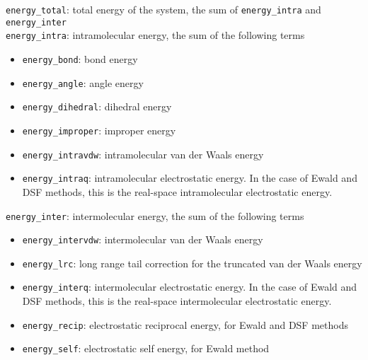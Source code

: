 \texttt{energy\_total}: total energy of the system, the sum of \texttt{energy\_intra} and \texttt{energy\_inter} \\
\texttt{energy\_intra}: intramolecular energy, the sum of the following terms
\begin{itemize}
\item \texttt{energy\_bond}: bond energy
\item \texttt{energy\_angle}: angle energy
\item \texttt{energy\_dihedral}: dihedral energy
\item \texttt{energy\_improper}: improper energy
\item \texttt{energy\_intravdw}: intramolecular van der Waals energy
\item \texttt{energy\_intraq}: intramolecular electrostatic energy.
In the case of Ewald and DSF methods, this is the real-space intramolecular electrostatic energy.
\end{itemize}
\texttt{energy\_inter}: intermolecular energy, the sum of the following terms
\begin{itemize}
\item \texttt{energy\_intervdw}: intermolecular van der Waals energy
\item \texttt{energy\_lrc}: long range tail correction for the truncated van der Waals energy
\item \texttt{energy\_interq}: intermolecular electrostatic energy.
In the case of Ewald and DSF methods, this is the real-space intermolecular electrostatic energy.
\item \texttt{energy\_recip}: electrostatic reciprocal energy, for Ewald and DSF methods
\item \texttt{energy\_self}: electrostatic self energy, for Ewald method
\end{itemize}

